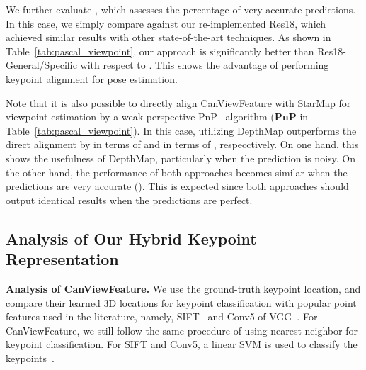 \documentclass[runningheads]{llncs}
\begin{document}
We further evaluate , which assesses the percentage of very accurate predictions. In this case, we simply compare against our re-implemented Res18, which achieved similar results with other state-of-the-art techniques. 
As shown in Table~\ref{tab:pascal_viewpoint}, our approach is significantly better than Res18-General/Specific with respect to . This shows the advantage of performing keypoint alignment for pose estimation. 

Note that it is also possible to directly align CanViewFeature with StarMap for viewpoint estimation by a weak-perspective PnP~\cite{pavlakos20176} algorithm (\textbf{PnP} in Table~\ref{tab:pascal_viewpoint}).
In this case, utilizing DepthMap outperforms the direct alignment by  in terms of  and  in terms of , respecctively. 
On one hand, this shows the usefulness of DepthMap, particularly when the prediction is noisy. On the other hand, the performance of both approaches becomes similar when the predictions are very accurate (). This is expected since both approaches should output identical results when the predictions are perfect.

\subsection{Analysis of Our Hybrid Keypoint Representation}
\label{Subsection:Advanced:Analysis}
\begin{table}[t]
\center
{}
\caption{Results for keypoint classification  on Pascal3D+ Dataset~\cite{xiang2014beyond}. We show keypoint classification accuracy of each category.}
\label{tab:kptclassification}
\end{table}

\noindent\textbf{Analysis of CanViewFeature.} 
We use the ground-truth keypoint location, and compare their learned 3D locations for keypoint classification with popular point features used in the literature, namely, SIFT~\cite{lowe2004distinctive} and Conv5 
of VGG~\cite{simonyan2014very}.
For CanViewFeature, we still follow the same procedure of using nearest neighbor for keypoint classification. 
For SIFT and Conv5, a linear SVM is used to classify the keypoints~\cite{long2014convnets}. 
\end{document}
